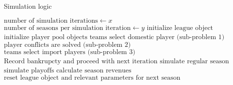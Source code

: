 \documentclass[12pt, a4paper]{article}
\begin{document}
\vspace{0.5cm}
\begin{algorithm}
\caption{Simulation logic}\label{alg:simulation}
\begin{algorithmic}
\State $\textrm{number of simulation iterations} \gets x$ 
\State $\textrm{number of seasons per simulation iteration} \gets y$ 
            \State $\textrm{initialize league object}$
        \EndIf
    \State $\textrm{initialize player pool objects}$
    \State $\textrm{teams select domestic player (sub-problem 1)}$
    \State $\textrm{player conflicts are solved (sub-problem 2)}$
    \State $\textrm{teams select import players (sub-problem 3)}$
            \State $\textrm{Record bankrupcty and proceed with next iteration}$
        \EndIf
    \State $\textrm{simulate regular season}$
    \State $\textrm{simulate playoffs}$
    \State $\textrm{calculate season revenues}$
    \State $\textrm{reset league object and relevant parameters for next season}$
    \EndFor
\EndFor
\end{algorithmic}
\end{algorithm}
\vspace{0.5cm}
\end{document}
